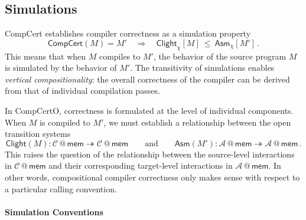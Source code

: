 \documentclass[acmsmall,screen,review,anonymous]{acmart}
\newcommand{\kw}[1]{\ensuremath{ \mathsf{#1} }}
\begin{document}


\subsection{Simulations} \label{sec:overview:sim} %


CompCert establishes compiler correctness
as a simulation property
\[
  \kw{CompCert}(M) = M'
  \quad\Rightarrow\quad
  \kw{Clight}_\chi[M] \:\le\: \kw{Asm}_\chi[M']
  \,.
\]
This means that when $M$ compiles to $M'$,
the behavior of the source program $M$
is simulated by the behavior of $M'$.
The transitivity of simulations enables
\emph{vertical compositionality}:
the overall correctness of the compiler
can be derived from that of
individual compilation passes.

In CompCertO,
correctness is formulated at the level of
individual components.
When $M$ is compiled to $M'$,
we must establish a relationship between
the open transition systems
\[
  \kw{Clight}(M) :
    \mathcal{C} \mathbin@ \kw{mem} \twoheadrightarrow
    \mathcal{C} \mathbin@ \kw{mem}
  \qquad \text{and} \qquad
  \kw{Asm}(M') :
    \mathcal{A} \mathbin@ \kw{mem} \twoheadrightarrow
    \mathcal{A} \mathbin@ \kw{mem}
  \,.
\]
This raises the question of the relationship
between the source-level interactions
in $\mathcal{C} \mathbin@ \kw{mem}$
and their corresponding target-level interactions
in $\mathcal{A} \mathbin@ \kw{mem}$.
In other words,
compositional compiler correctness only makes sense
with respect to a particular calling convention.

\paragraph{Simulation Conventions}
\end{document}
